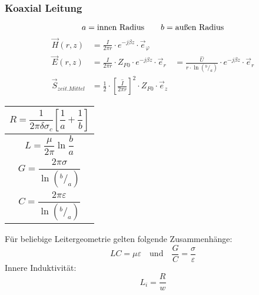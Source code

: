 \subsubsection{Koaxial Leitung}
{\small\[
	a = \text{innen Radius} \qquad b = \text{außen Radius} \\
	\]}
\begin{align*}
	\vec{H}(r, z)         & = \frac{\hat{I}}{2\pi r}\cdot e^{-j\beta z}\cdot\vec{e}_\varphi                   \\
	\vec{E}(r, z)         & = \frac{\hat{I}}{2\pi r}\cdot Z_{F0}\cdot e^{-j\beta z} \cdot\vec{e}_r
	& = \frac{\hat{U}}{r \cdot\ln{(^{b}/_{a})}}\cdot e^{-j\beta z}\cdot\vec{e}_r        \\
	\vec{S}_{zeit.Mittel} & = \frac{1}{2}\cdot\left[\frac{\hat{I}}{2\pi r}\right]^2\cdot Z_{F0}\cdot\vec{e}_z
\end{align*}

{\renewcommand*{\arraystretch}{0.2}
	\begin{tabularx}{0.5\columnwidth}{|X|}
		\hline
		\[R=\frac{1}{2\pi\delta\sigma_c}\left[\frac{1}{a}+\frac{1}{b}\right]\] \\
		\hline
		\[L=\frac{\mu}{2\pi}\ln\frac{b}{a}\]                                   \\
		\hline
		\[G=\frac{2\pi\sigma}{\ln(^b/_a)}\]                                    \\
		\hline
		\[C=\frac{2\pi\varepsilon}{\ln(^b/_a)}\]                               \\
		\hline
\end{tabularx}}



\vspace{1ex}
Für beliebige Leitergeometrie gelten folgende Zusammenhänge:
\[
LC = \mu\varepsilon \quad \text{und} \quad \frac{G}{C} = \frac{\sigma}{\varepsilon}
\]
Innere Induktivität:
\[
L_i = \frac{R}{w}
\]
\textbf{\color{red}{Leitungen gehen HIN und ZURÜCK!!!}\\
	\color{red}{Länge verdoppeln!!!}
}